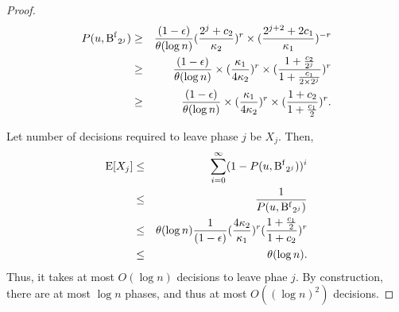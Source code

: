 \begin{proof}
\begin{eqnarray*}
    P(u, \operatorname{B^{f}}_{2^{j}} ) &\ge& \frac{(1-\epsilon)}{\theta( \log n )} (\frac{2^{j}+c_2}{\kappa_2})^{r} \times (\frac{2^{j+2} + 2 c_1}{\kappa_1})^{-r} \\
    &\ge& \frac{(1-\epsilon)}{\theta( \log n )} \times (\frac{\kappa_1}{4\kappa_2} )^{r} \times ( \frac{ 1 + \frac{c_2}{2^{j}} }{ 1 + \frac{c_1}{2 \times 2^{j}} })^{r}\\
    &\ge& \frac{(1-\epsilon)}{\theta( \log n )} \times (\frac{\kappa_1}{4\kappa_2} )^{r} \times ( \frac{ 1 + c_2 }{ 1 + \frac{c_1}{2} })^{r} .\\
\end{eqnarray*}

Let number of decisions required to leave phase $j$ be $X_j$. Then, 
\begin{eqnarray*}
    \operatorname{E}[X_j] &\le& \sum_{i=0}^{\infty} (1 - P(u, \operatorname{B^{f}}_{2^{j}} ))^i \\
            &\le& \frac{1}{P(u, \operatorname{B^{f}}_{2^{j}} )} \\
            &\le& \theta( \log n ) \frac{1}{(1-\epsilon)} (\frac{4 \kappa_2}{\kappa_1})^{r} ( \frac{ 1 + \frac{c_1}{2} }{ 1 + c_2 })^{r}\\
            &\le& \theta( \log n ).
\end{eqnarray*}
Thus, it takes at most $O(\log n)$ decisions to leave phae $j$. By construction, there are at most $\log n$
phases, and thus at most $O((\log n)^2)$ decisions.
\end{proof}

